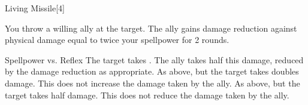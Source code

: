 \begin{spellsection}{Living Missile}[4]
    \begin{spellheader}
    \end{spellheader}
    \begin{spellcontent}
        \begin{spelltargetinginfo}
        \end{spelltargetinginfo}
        \begin{spelleffects}
            \spelleffect You throw a willing ally at the target. The ally gains damage reduction against physical damage equal to twice your spellpower for 2 rounds.
            \begin{spellattack}{Spellpower vs. Reflex}
                \spellsuccess The target takes . The ally takes half this damage, reduced by the damage reduction as appropriate.
                \spellcritical As above, but the target takes doubles damage. This does not increase the damage taken by the ally.
                \spellfailure As above, but the target takes half damage. This does not reduce the damage taken by the ally.
            \end{spellattack}
        \end{spelleffects}
    \end{spellcontent}
    \begin{spellfooter}
        \miscastexplode
    \end{spellfooter}
    \begin{spellaugments}
    \end{spellaugments}
\end{spellsection}

